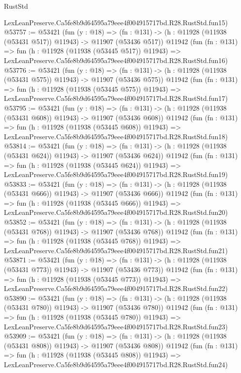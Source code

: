 \begin{lexlean}{RustStd}
\begin{coremodule}
    LexLeanPreserve.Ca5fe8b9d64595a79eee4f004915717bd.R28.RustStd.fun15)
@53757 := @53421
    (fun (y : @18) =>
    (fn : @131) -> (h : @11928 (@11938 (@53431 @517)) @11943) -> @11907 (@53436 @517))
    @11942
    (fun (fn : @131) =>
    fun (h : @11928 (@11938 (@53445 @517)) @11943) =>
    LexLeanPreserve.Ca5fe8b9d64595a79eee4f004915717bd.R28.RustStd.fun16)
@53776 := @53421
    (fun (y : @18) =>
    (fn : @131) -> (h : @11928 (@11938 (@53431 @575)) @11943) -> @11907 (@53436 @575))
    @11942
    (fun (fn : @131) =>
    fun (h : @11928 (@11938 (@53445 @575)) @11943) =>
    LexLeanPreserve.Ca5fe8b9d64595a79eee4f004915717bd.R28.RustStd.fun17)
@53795 := @53421
    (fun (y : @18) =>
    (fn : @131) -> (h : @11928 (@11938 (@53431 @608)) @11943) -> @11907 (@53436 @608))
    @11942
    (fun (fn : @131) =>
    fun (h : @11928 (@11938 (@53445 @608)) @11943) =>
    LexLeanPreserve.Ca5fe8b9d64595a79eee4f004915717bd.R28.RustStd.fun18)
@53814 := @53421
    (fun (y : @18) =>
    (fn : @131) -> (h : @11928 (@11938 (@53431 @624)) @11943) -> @11907 (@53436 @624))
    @11942
    (fun (fn : @131) =>
    fun (h : @11928 (@11938 (@53445 @624)) @11943) =>
    LexLeanPreserve.Ca5fe8b9d64595a79eee4f004915717bd.R28.RustStd.fun19)
@53833 := @53421
    (fun (y : @18) =>
    (fn : @131) -> (h : @11928 (@11938 (@53431 @666)) @11943) -> @11907 (@53436 @666))
    @11942
    (fun (fn : @131) =>
    fun (h : @11928 (@11938 (@53445 @666)) @11943) =>
    LexLeanPreserve.Ca5fe8b9d64595a79eee4f004915717bd.R28.RustStd.fun20)
@53852 := @53421
    (fun (y : @18) =>
    (fn : @131) -> (h : @11928 (@11938 (@53431 @768)) @11943) -> @11907 (@53436 @768))
    @11942
    (fun (fn : @131) =>
    fun (h : @11928 (@11938 (@53445 @768)) @11943) =>
    LexLeanPreserve.Ca5fe8b9d64595a79eee4f004915717bd.R28.RustStd.fun21)
@53871 := @53421
    (fun (y : @18) =>
    (fn : @131) -> (h : @11928 (@11938 (@53431 @773)) @11943) -> @11907 (@53436 @773))
    @11942
    (fun (fn : @131) =>
    fun (h : @11928 (@11938 (@53445 @773)) @11943) =>
    LexLeanPreserve.Ca5fe8b9d64595a79eee4f004915717bd.R28.RustStd.fun22)
@53890 := @53421
    (fun (y : @18) =>
    (fn : @131) -> (h : @11928 (@11938 (@53431 @780)) @11943) -> @11907 (@53436 @780))
    @11942
    (fun (fn : @131) =>
    fun (h : @11928 (@11938 (@53445 @780)) @11943) =>
    LexLeanPreserve.Ca5fe8b9d64595a79eee4f004915717bd.R28.RustStd.fun23)
@53909 := @53421
    (fun (y : @18) =>
    (fn : @131) -> (h : @11928 (@11938 (@53431 @808)) @11943) -> @11907 (@53436 @808))
    @11942
    (fun (fn : @131) =>
    fun (h : @11928 (@11938 (@53445 @808)) @11943) =>
    LexLeanPreserve.Ca5fe8b9d64595a79eee4f004915717bd.R28.RustStd.fun24)

\end{coremodule}
\end{lexlean}
